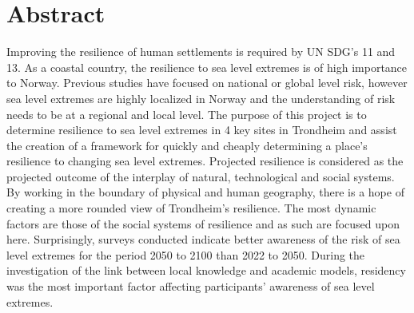 

\section{Abstract}

Improving the resilience of human settlements is required by UN SDG's 11 and 13. As a coastal country, the resilience to sea level extremes is of high importance to Norway. Previous studies have focused on national or global level risk, however sea level extremes are highly localized in Norway and the understanding of risk needs to be at a regional and local level. The purpose of this project is to determine resilience to sea level extremes in 4 key sites in Trondheim and assist the creation of a framework for quickly and cheaply determining a place's resilience to changing sea level extremes. Projected resilience is considered as the projected outcome of the interplay of natural, technological and social systems. By working in the boundary of physical and human geography, there is a hope of creating a more rounded view of Trondheim's resilience. The most dynamic factors are those of the social systems of resilience and as such are focused upon here. Surprisingly, surveys conducted indicate better awareness of the risk of sea level extremes for the period 2050 to 2100 than 2022 to 2050. During the investigation of the link between local knowledge and academic models, residency was the most important factor affecting participants' awareness of sea level extremes.   

\newpage

